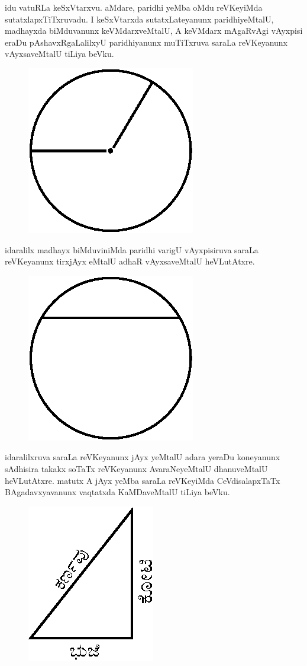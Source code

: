 idu vatuRLa keSxVtarxvu. aMdare, paridhi yeMba oMdu reVKeyiMda
sutatxlapxTiTxruvadu. I keSxVtarxda sutatxLateyanunx paridhiyeMtalU,
madhayxda biMduvanunx keVMdarxveMtalU, A keVMdarx mAgaRvAgi vAyxpisi
eraDu pAshavxRgaLalilxyU paridhiyanunx muTiTxruva saraLa reVKeyanunx
vAyxsaveMtalU tiLiya beVku.

\eject

\begin{figure}[H]
\centering
\includegraphics[scale=.8]{figure/fig13.eps}
\end{figure}
idaralilx madhayx biMduviniMda paridhi varigU vAyxpisiruva saraLa
reVKeyanunx tirxjAyx eMtalU adhaR vAyxsaveMtalU heVLutAtxre.
\begin{figure}[H]
\centering
\includegraphics[scale=.8]{figure/fig14.eps}
\end{figure}
idaralilxruva saraLa reVKeyanunx jAyx yeMtalU adara yeraDu koneyanunx
sAdhisira takakx soTaTx reVKeyanunx AvaraNeyeMtalU dhanuveMtalU
heVLutAtxre. matutx A jAyx yeMba saraLa reVKeyiMda CeVdisalapxTaTx
BAgadavxyavanunx vaqtatxda KaMDaveMtalU tiLiya beVku.
\begin{figure}[H]
\centering
\includegraphics[scale=.9]{figure/fig15.eps}
\end{figure}
